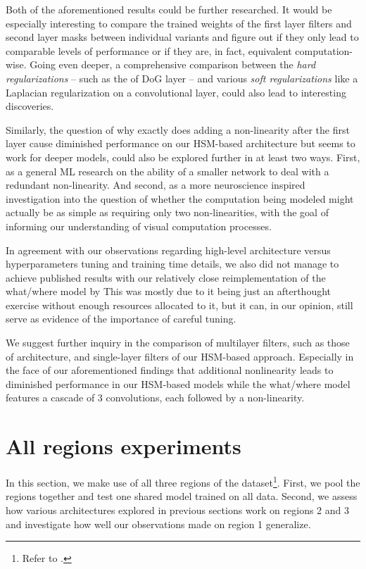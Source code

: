 Both of the aforementioned results could be further researched. It would be especially interesting to compare the trained weights of the first layer filters and second layer masks between individual variants and figure out if they only lead to comparable levels of performance or if they are, in fact, equivalent computation-wise. Going even deeper, a comprehensive comparison between the \textit{hard regularizations} -- such as the of DoG layer -- and various \textit{soft regularizations} like a Laplacian regularization on a convolutional layer, could also lead to interesting discoveries. 

Similarly, the question of why exactly does adding a non-linearity after the first layer cause diminished performance on our HSM-based architecture but seems to work for deeper models, could also be explored further in at least two ways. First, as a general ML research on the ability of a smaller network to deal with a redundant non-linearity. And second, as a more neuroscience inspired investigation into the question of whether the computation being modeled might actually be as simple as requiring only two non-linearities, with the goal of informing our understanding of visual computation processes.


In agreement with our observations regarding high-level architecture versus hyperparameters tuning and training time details, we also did not manage to achieve published results with our relatively close reimplementation of the what/where model by \citeauthor{klindt} This was mostly due to it being just an afterthought exercise without enough resources allocated to it, but it can, in our opinion, still serve as evidence of the importance of careful tuning. 

We suggest further inquiry in the comparison of multilayer filters, such as those of \citeauthor{klindt} architecture, and single-layer filters of our HSM-based approach. Especially in the face of our aforementioned findings that additional nonlinearity leads to diminished performance in our HSM-based models while the what/where model features a cascade of 3 convolutions, each followed by a non-linearity. 

\section{All regions experiments}

In this section, we make use of all three regions of the dataset\footnote{Refer to .}. First, we pool the regions together and test one shared model trained on all data. Second, we assess how various architectures explored in previous sections work on regions 2 and 3 and investigate how well our observations made on region 1 generalize.

